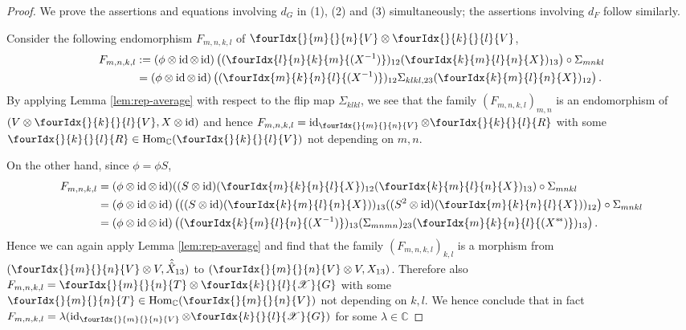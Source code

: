 \documentclass[10pt]{article}
\DeclareMathOperator{\id}{id}
\DeclareMathOperator{\Hom}{Hom}
\newcommand{\dual}[1]{#1^{*}}
\newcommand{\C}{\mathbb{C}}
\newcommand{\Gr}[5]{\fourIdx{#2}{#4}{#3}{#5}{#1}}%
\newcommand{\Gru}[3]{\Gr{#1}{}{}{#2}{#3}}
\theoremstyle{definition}
\numberwithin{equation}{section}
\begin{document}
\begin{proof}
  We prove the assertions and equations involving $d_G$ in (1), (2)
  and (3)  simultaneously; the assertions involving $d_F$  follow similarly.

  Consider
  the following endomorphism $F_{m,n,k,l}$ of $\Gru{V}{m}{n}\otimes \Gru{V}{k}{l}$, 
  \begin{align*}
    F_{m,n,k,l}
    &:=(\phi \otimes \id \otimes \id)\left((\Gr{(X^{-1})}{l}{k}{n}{m})_{12}(\Gr{X}{k}{l}{m}{n})_{13}\right)
    \circ \Sigma_{mnkl} \\ &= (\phi \otimes \id \otimes
    \id)\left((\Gr{(X^{-1})}{m}{n}{k}{l})_{12}
      \Sigma_{klkl,23}(\Gr{X}{k}{l}{m}{n})_{12}\right).
  \end{align*}
  By applying Lemma \ref{lem:rep-average} with respect to the flip map $\Sigma_{klkl}$, we see that the family $(F_{m,n,k,l})_{m,n}$ is
  an endomorphism of $(V \otimes \Gru{V}{k}{l}, X\otimes \id)$ and hence
  $F_{m,n,k,l} = \id_{\Gru{V}{m}{n}} \otimes \Gru{R}{k}{l}$ with some $\Gru{R}{k}{l} \in \Hom_{\C}(\Gru{V}{k}{l})$ not
  depending on $m,n$. 
  
  On the other hand, since $\phi = \phi S$,
  \begin{align*}
    F_{m,n,k,l} &= (\phi \otimes \id \otimes \id)((S \otimes
    \id)(\Gr{X}{m}{n}{k}{l})_{12}(\Gr{X}{k}{l}{m}{n})_{13})
    \circ \Sigma_{mnkl} \\
    &= (\phi \otimes \id \otimes \id)\left(((S \otimes
      \id)(\Gr{X}{k}{l}{m}{n}))_{13}
      ((S^{2} \otimes \id)(\Gr{X}{m}{n}{k}{l}))_{12}\right)     \circ \Sigma_{mnkl}\\
    &= (\phi \otimes \id \otimes
    \id)\left((\Gr{(X^{-1})}{k}{l}{m}{n})_{13} (\Sigma_{mnmn})_{23}
      (\Gr{(\dual{\dual{X}{}\!})}{m}{n}{k}{l})_{13}\right).
  \end{align*}
  Hence we can again apply Lemma \ref{lem:rep-average} and
  find that the family $(F_{m,n,k,l})_{k,l}$ is a morphism from $(\Gru{V}{m}{n} \otimes V, \hat{\hat{X}}_{13})$ to $(\Gru{V}{m}{n} \otimes V,
 X_{13})$. Therefore also $F_{m,n,k,l} = \Gru{T}{m}{n} \otimes \Gr{G}{k}{l}{}{\mathscr{X}}$
  with some $\Gru{T}{m}{n} \in \mathcal{\Hom_{\C}}(\Gru{V}{m}{n})$
  not depending on $k,l$. We hence conclude that in fact $F_{m,n,k,l} = \lambda
  (\id_{\Gru{V}{m}{n}} \otimes \Gr{G}{k}{l}{}{\mathscr{X}})$  for some $\lambda\in \C$
  

\end{proof}
\end{document}
